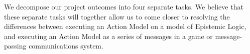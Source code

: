 \documentclass[12pt, a4paper]{article}
\begin{document}
We decompose our project outcomes into four separate tasks.
We believe that these separate tasks will together allow us to come closer to
resolving the differences between executing an Action Model on a model of
Epistemic Logic, and executing an Action Model as a series of messages in a game
or message-passing communications system.

%
\end{document}
